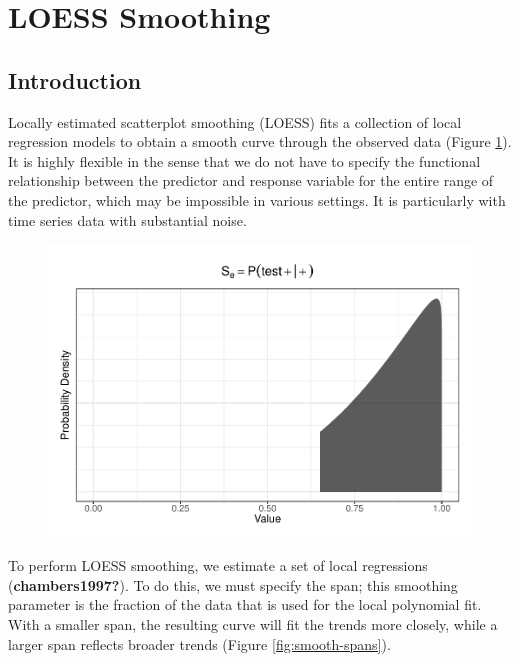\documentclass[12pt,twoside]{smiththesis}
\begin{document}
\newpage

\hypertarget{loess-smoothing}{%
\section{LOESS Smoothing}\label{loess-smoothing}}

\hypertarget{introduction}{%
\subsection{Introduction}\label{introduction}}

Locally estimated scatterplot smoothing (LOESS) fits a collection of local regression models to obtain a smooth curve through the observed data (Figure \ref{fig:loess}). It is highly flexible in the sense that we do not have to specify the functional relationship between the predictor and response variable for the entire range of the predictor, which may be impossible in various settings. It is particularly with time series data with substantial noise.
\begin{figure}
\centering
\includegraphics{thesis_files/figure-latex/unnamed-chunk-14-1.pdf}
\caption{\label{fig:unnamed-chunk-14}\label{fig:loess}}
\end{figure}
To perform LOESS smoothing, we estimate a set of local regressions (\textbf{chambers1997?}). To do this, we must specify the span; this smoothing parameter is the fraction of the data that is used for the local polynomial fit. With a smaller span, the resulting curve will fit the trends more closely, while a larger span reflects broader trends (Figure \ref{fig:smooth-spans}).
\end{document}
